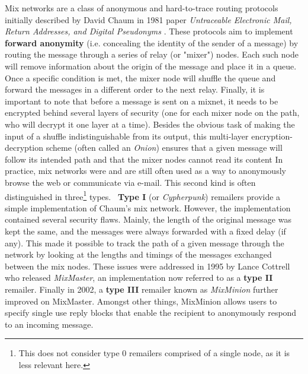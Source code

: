 \documentclass[11pt, a4paper]{article}
\begin{document}
        Mix networks are a class of anonymous and hard-to-trace routing protocols initially described by David Chaum in 1981 paper \textit{Untraceable Electronic Mail, Return Addresses, and Digital Pseudonyms} \cite{chaum84}.
        These protocols aim to implement \textbf{forward anonymity} (i.e. concealing the identity of the sender of a message) by routing the message through a series of relay (or "mixer") nodes.
        Each such node will remove information about the origin of the message and place it in a queue.
        Once a specific condition is met, the mixer node will shuffle the queue and forward the messages in a different order to the next relay.
        Finally, it is important to note that before a message is sent on a mixnet, it needs to be encrypted behind several layers of security (one for each mixer node on the path, who will decrypt it one layer at a time).
        Besides the obvious task of making the input of a shuffle indistinguishable from its output, this multi-layer encryption-decryption scheme (often called an \textit{Onion}) ensures that a given message will follow its intended path and that the mixer nodes cannot read its content
        \bigbreak
        In practice, mix networks were and are still often used as a way to anonymously browse the web or communicate via e-mail.
        This second kind is often distinguished in three\footnote{This does not consider type 0 remailers comprised of a single node, as it is less relevant here.} types. \
        \textbf{Type I} (or \textit{Cypherpunk}) remailers provide a simple implementation of Chaum's mix network.
        However, the implementation contained several security flaws.
        Mainly, the length of the original message was kept the same, and the messages were always forwarded with a fixed delay (if any).
        This made it possible to track the path of a given message through the network by looking at the lengths and timings of the messages exchanged between the mix nodes.
        These issues were addressed in 1995 by Lance Cottrell who released \textit{MixMaster}, an implementation now referred to as a \textbf{type II} remailer.
        Finally in 2002, a \textbf{type III} remailer known as \textit{MixMinion} \cite{mixminion} further improved on MixMaster.
        Amongst other things, MixMinion allows users to specify single use reply blocks that enable the recipient to anonymously respond to an incoming message.
\end{document}
